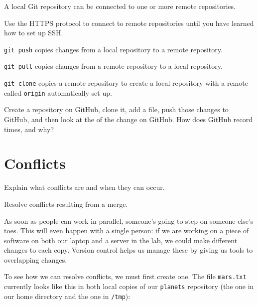 \documentclass{book}
\begin{document}
\begin{keypoints}
\begin{swcitemize}
\item
  A local Git repository can be connected to one or more remote
  repositories.
\item
  Use the HTTPS protocol to connect to remote repositories until you
  have learned how to set up SSH.
\item
  \texttt{git push} copies changes from a local repository to a remote
  repository.
\item
  \texttt{git pull} copies changes from a remote repository to a local
  repository.
\item
  \texttt{git clone} copies a remote repository to create a local
  repository with a remote called \texttt{origin} automatically set up.
\end{swcitemize}
\end{keypoints}

\begin{challenge}
  Create a repository on GitHub, clone it, add a file, push those
  changes to GitHub, and then look at the
   of the change on GitHub. How does
  GitHub record times, and why?
\end{challenge}

\section{Conflicts}

\begin{objectives}
\begin{swcitemize}
\item
  Explain what conflicts are and when they can occur.
\item
  Resolve conflicts resulting from a merge.
\end{swcitemize}
\end{objectives}

As soon as people can work in parallel, someone's going to step on
someone else's toes. This will even happen with a single person: if we
are working on a piece of software on both our laptop and a server in
the lab, we could make different changes to each copy. Version control
helps us manage these  by giving us
tools to  overlapping changes.

To see how we can resolve conflicts, we must first create one. The file
\texttt{mars.txt} currently looks like this in both local copies of our
\texttt{planets} repository (the one in our home directory and the one
in \texttt{/tmp}):
\end{document}

